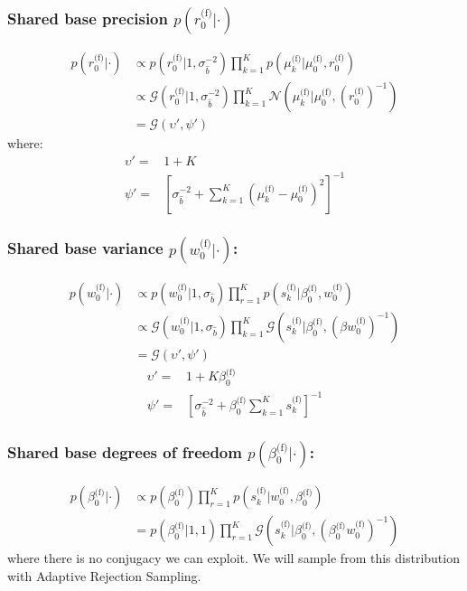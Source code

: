\documentclass[smallextended]{svjour3}          %
\newcommand{\muo}{\mu_{0}^\text{(f)}}
\newcommand{\ro}{r_{0}^\text{(f)}}
\newcommand{\invro}{\left(r_{0}^\text{(f)}\right)^{-1}}
\newcommand{\wo}{w_{0}^\text{(f)}}
\newcommand{\betaof}{\beta_{0}^\text{(f)}}
\newcommand{\muk}{\mu_{k}^\text{(f)}}
\newcommand{\sk}{s_{k}^\text{(f)}}
\begin{document}
\subsubsection*{Shared base precision $p(\ro | \cdot)$}
\begin{align*}
p(\ro | \cdot) 
&\propto 
p(\ro | 1, \sigma_{\hat{b}}^{-2}) 
\prod_{k = 1}^K p(\muk | \muo, \ro) \\
&\propto
\mathcal{G}(\ro | 1, \sigma_{\hat{b}}^{-2}) 
\prod_{k = 1}^K \mathcal{N}\left(\muk | \muo,  \invro\right) \\
&= \mathcal{G}(\upsilon', \psi')
\end{align*}
where:
\begin{align*}
\upsilon' =& 1+K\\
\psi' =& \left[\sigma_{\hat{b}}^{-2} + \sum_{k=1}^K \left(\muk- \muo\right)^2\right]^{-1}
\end{align*}

\subsubsection*{Shared base variance $p(\wo | \cdot)$:}
\begin{align*}
p(\wo | \cdot) 
&\propto 
p(\wo | 1, \sigma_{\hat{b}})
\prod_{r=1}^K p\left(\sk | \betaof, \wo\right)\\
&\propto
\mathcal{G}(\wo | 1, \sigma_{\hat{b}}) 
\prod_{k=1}^K \mathcal{G}\left(\sk | \betaof, \left(\beta\wo\right)^{-1}\right)\\
&= \mathcal{G}(\upsilon', \psi')   
\end{align*}
\begin{align*}
\upsilon' =& 1 + K\betaof\\
\psi' =& 
\left[\sigma_{\hat{b}}^{-2} +  \betaof \sum_{k=1}^K \sk\right]^{-1}
\end{align*}

\subsubsection*{Shared base degrees of freedom $p(\betaof | \cdot)$:}
\begin{align*}
p(\betaof | \cdot) 
&\propto
p(\betaof) \prod_{r=1}^K p(\sk | \wo ,  \betaof)\\
&=p(\betaof | 1, 1)\prod_{r=1}^K  \mathcal{G} \left(\sk |\betaof, \left(\betaof  \wo \right)^{-1}\right)
\end{align*}
where there is no conjugacy we can exploit. We will sample from this distribution with Adaptive Rejection Sampling.
\end{document}
